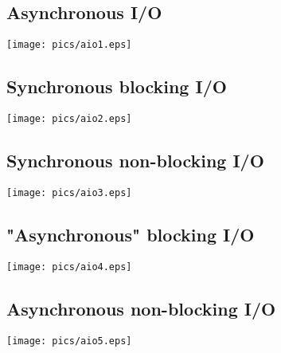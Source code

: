 \documentclass[xga]{xdvislides}
\begin{document}
\subsection{Asynchronous I/O}
\begin{center}
\texttt{[image: pics/aio1.eps]}
\end{center}

\subsection{Synchronous blocking I/O}
\begin{center}
\texttt{[image: pics/aio2.eps]}
\end{center}

\subsection{Synchronous non-blocking I/O}
\begin{center}
\texttt{[image: pics/aio3.eps]}
\end{center}

\subsection{"Asynchronous" blocking I/O}
\begin{center}
\texttt{[image: pics/aio4.eps]}
\end{center}

\subsection{Asynchronous non-blocking I/O}
\begin{center}
\texttt{[image: pics/aio5.eps]}
\end{center}
\end{document}
